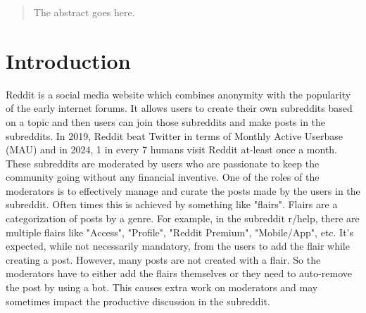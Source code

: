 \documentclass[conference]{IEEEtran}
\begin{document}




\maketitle

\begin{abstract}
The abstract goes here.
\end{abstract}





%
\IEEEpeerreviewmaketitle



\section{Introduction}
Reddit is a social media website which combines anonymity with the popularity of the early internet forums. It allows users to create their own subreddits based on a topic and then users can join those subreddits and make posts in the subreddits. In 2019, Reddit beat Twitter in terms of Monthly Active Userbase (MAU) and in 2024, 1 in every 7 humans visit Reddit at-least once a month. These subreddits are moderated by users who are passionate to keep the community going without any financial inventive. One of the roles of the moderators is to effectively manage and curate the posts made by the users in the subreddit. Often times this is achieved by something like "flairs". Flairs are a categorization of posts by a genre. For example, in the subreddit r/help, there are multiple flairs like "Access", "Profile", "Reddit Premium", "Mobile/App", etc. It's expected, while not necessarily mandatory, from the users to add the flair while creating a post. However, many posts are not created with a flair. So the moderators have to either add the flairs themselves or they need to auto-remove the post by using a bot. This causes extra work on moderators and may sometimes impact the productive discussion in the subreddit. 
\end{document}

